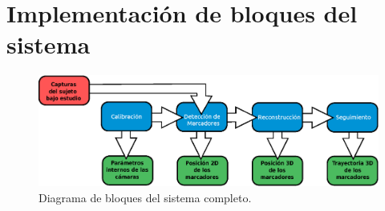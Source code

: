 \section{Implementación de bloques del sistema}



\begin{figure}[H]
\begin{center}
\includegraphics[scale=0.8]{img/Sistema_completo/Diagrama_de_bloques}
\end{center}
\caption{Diagrama de bloques del sistema completo.}
\label{bloquesSist}
\end{figure}


